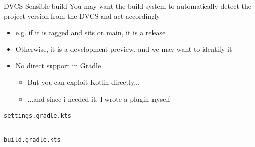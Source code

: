 \documentclass[presentation]{beamer}
\newcommand{\codefile}[4]{
	\begin{block}{\texttt{#2}}
		\inputminted[fontsize=#3,linenos=true,breaklines=true]{#4}{"workspace/#1/#2"}
	\end{block}
}
\newcommand{\kotlin}[3]{\codefile{#1}{#2}{#3}{kotlin}}
\begin{document}
\begin{frame}{DVCS-Sensible build}
    You may want the build system to automatically detect the project version from the DVCS and act accordingly
    \begin{itemize}
        \item e.g. if it is tagged and sits on main, it is a release
        \item Otherwise, it is a development preview, and we may want to identify it
        \item No direct support in Gradle 
        \begin{itemize}
            \item But you can exploit Kotlin directly...
            \item ...and since i needed it, I wrote a plugin myself
        \end{itemize}
    \end{itemize}
    \kotlin{26-Git}{settings.gradle.kts}{\scriptsize}
    \kotlin{26-Git}{build.gradle.kts}{\tiny}
\end{frame}
\end{document}
